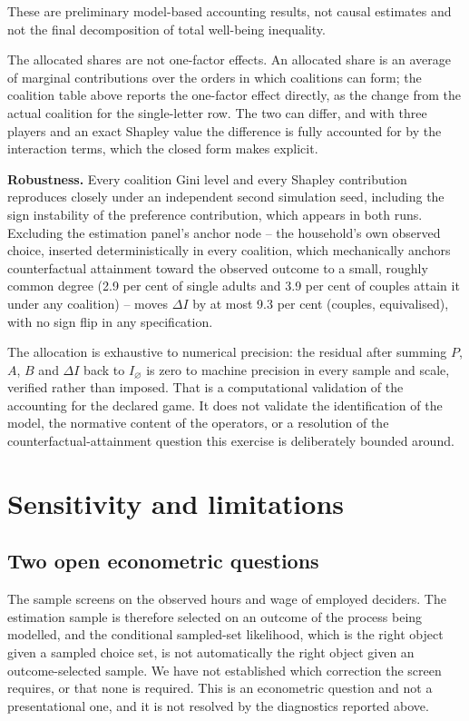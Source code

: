 \documentclass[11pt,a4paper]{article}
\begin{document}
These are preliminary model-based accounting results, not causal estimates and not the final decomposition of total well-being inequality.

The allocated shares are not one-factor effects. An allocated share is an average of marginal contributions over the orders in which coalitions can form; the coalition table above reports the one-factor effect directly, as the change from the actual coalition for the single-letter row. The two can differ, and with three players and an exact Shapley value the difference is fully accounted for by the interaction terms, which the closed form makes explicit.

\textbf{Robustness.} Every coalition Gini level and every Shapley contribution reproduces closely under an independent second simulation seed, including the sign instability of the preference contribution, which appears in both runs. Excluding the estimation panel's anchor node -- the household's own observed choice, inserted deterministically in every coalition, which mechanically anchors counterfactual attainment toward the observed outcome to a small, roughly common degree (2.9 per cent of single adults and 3.9 per cent of couples attain it under any coalition) -- moves \(\Delta I\) by at most 9.3 per cent (couples, equivalised), with no sign flip in any specification.

The allocation is exhaustive to numerical precision: the residual after summing \(P\), \(A\), \(B\) and \(\Delta I\) back to \(I_\varnothing\) is zero to machine precision in every sample and scale, verified rather than imposed. That is a computational validation of the accounting for the declared game. It does not validate the identification of the model, the normative content of the operators, or a resolution of the counterfactual-attainment question this exercise is deliberately bounded around.

\section{Sensitivity and limitations}\label{sensitivity-and-limitations}

\subsection{Two open econometric questions}\label{two-open-econometric-questions}

The sample screens on the observed hours and wage of employed deciders. The estimation sample is therefore selected on an outcome of the process being modelled, and the conditional sampled-set likelihood, which is the right object given a sampled choice set, is not automatically the right object given an outcome-selected sample. We have not established which correction the screen requires, or that none is required. This is an econometric question and not a presentational one, and it is not resolved by the diagnostics reported above.
\end{document}
